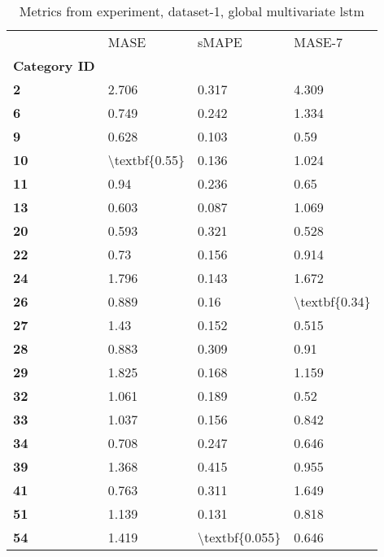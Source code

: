 \begin{table}[h]
\centering
\caption{Metrics from experiment, dataset-1, global multivariate lstm}
\label{table:global-multivariate-lstm-dataset-1}
\begin{tabular}{llll}
\toprule
{} &           MASE &           sMAPE &         MASE-7 \\
\textbf{Category ID} &                &                 &                \\
\midrule
\textbf{2          } &          2.706 &           0.317 &          4.309 \\
\textbf{6          } &          0.749 &           0.242 &          1.334 \\
\textbf{9          } &          0.628 &           0.103 &           0.59 \\
\textbf{10         } &  \textbackslash textbf\{0.55\} &           0.136 &          1.024 \\
\textbf{11         } &           0.94 &           0.236 &           0.65 \\
\textbf{13         } &          0.603 &           0.087 &          1.069 \\
\textbf{20         } &          0.593 &           0.321 &          0.528 \\
\textbf{22         } &           0.73 &           0.156 &          0.914 \\
\textbf{24         } &          1.796 &           0.143 &          1.672 \\
\textbf{26         } &          0.889 &            0.16 &  \textbackslash textbf\{0.34\} \\
\textbf{27         } &           1.43 &           0.152 &          0.515 \\
\textbf{28         } &          0.883 &           0.309 &           0.91 \\
\textbf{29         } &          1.825 &           0.168 &          1.159 \\
\textbf{32         } &          1.061 &           0.189 &           0.52 \\
\textbf{33         } &          1.037 &           0.156 &          0.842 \\
\textbf{34         } &          0.708 &           0.247 &          0.646 \\
\textbf{39         } &          1.368 &           0.415 &          0.955 \\
\textbf{41         } &          0.763 &           0.311 &          1.649 \\
\textbf{51         } &          1.139 &           0.131 &          0.818 \\
\textbf{54         } &          1.419 &  \textbackslash textbf\{0.055\} &          0.646 \\
\bottomrule
\end{tabular}
\end{table}

